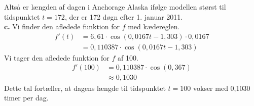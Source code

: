 \documentclass{article}
\begin{document}
Altså er længden af dagen i Anchorage Alaska ifølge modellen størst til tidspunktet $t=172$, der er 172 døgn efter 1. januar 2011.\\[1ex]
\textbf{c.} Vi finder den afledede funktion for $f$ med kædereglen. 
\begin{equation*}
\begin{split}
  f'(t)&=6,61\cdot \cos(0,0167t-1,303)\cdot 0,0167 \\ 
  &= 0,110387 \cdot \cos(0,0167t-1,303)
\end{split}
\end{equation*}
Vi tager den afledede funktion for $f$ af 100.
\begin{equation*}
\begin{split}
  f'(100)&=0,110387 \cdot \cos(0,367) \\ 
  &\approx 0,1030
\end{split}
\end{equation*}
Dette tal fortæller, at dagens længde til tidspunktet $t=100$ vokser med 0,1030 timer per dag. 
\end{document}
